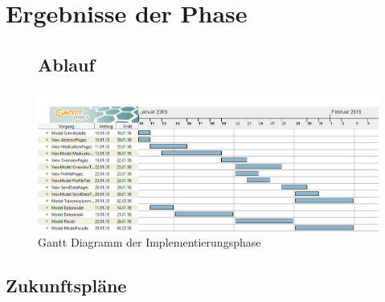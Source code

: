 \documentclass[a4paper]{scrreprt}
\begin{document}
\chapter{Ergebnisse der Phase}
\begin{figure}
\section{Ablauf}
\begin{minipage}[c]{\textwidth}
\centering
\includegraphics[width=0.95\textheight, angle=90]{Gantt/GanttDiagrammImplementierung}
\caption{Gantt Diagramm der Implementierungsphase}
\end{minipage}
\end{figure}
\section{Zukunftspläne}



\glsaddall
\printnoidxglossaries

\listoffigures
 
\end{document}
